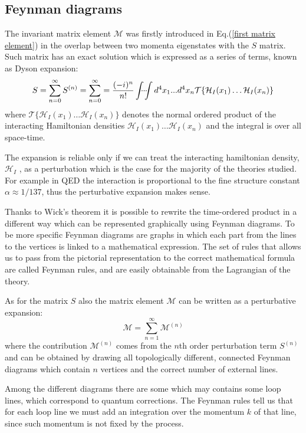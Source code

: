 \documentclass[../main/main.tex]{subfiles}
\begin{document}
\subsection{Feynman diagrams}
The invariant matrix element $\mathcal{M}$ was firstly introduced in Eq.(\ref{first matrix element}) in the overlap between two momenta
eigenstates with the $S$ matrix.
Such matrix has an exact solution which is expressed as a series of terms, known as Dyson expansion:
\begin{equation}
	\label{S}
	S = \sum_{n = 0}^{\infty} S^{(n)} = \sum_{n = 0}^{\infty} =  \frac{(-i)^n}{n!}\idotsint d^4 x_1 ... d^4 x_n \mathcal{T}\{ \mathcal{H}_I(x_1) \dots \mathcal{H}_I(x_n) \}
\end{equation}
where $\mathcal{T}\{ \mathcal{H}_I(x_1) \dots \mathcal{H}_I(x_n) \}$ denotes the normal ordered product of the interacting 
Hamiltonian densities $ \mathcal{H}_I(x_1) \dots \mathcal{H}_I(x_n)$ and the integral is over all space-time.

The expansion is reliable only if we can treat the interacting hamiltonian density, $\mathcal{H}_I$ , as a perturbation which is the case for 
the majority of the theories studied. For example in QED the interaction is proportional to the fine structure constant $\alpha \approx 1/137$, thus the perturbative expansion makes sense.

Thanks to Wick's theorem it is possible to rewrite the time-ordered product in a different way which can be represented graphically using Feynman diagrams. 
To be more specific Feynman diagrams are graphs in which each part from the lines to the vertices is linked to a mathematical expression.
The set of rules that allows us to pass from the pictorial representation to the correct mathematical formula are called Feynman rules, and
are easily obtainable from the Lagrangian of the theory.

As for the matrix $S$ also the matrix element $\mathcal{M}$ can be written as a perturbative expansion:
\begin{equation}
	\label{exp M}
	\mathcal{M}= \sum_{n = 1}^{\infty} \mathcal{M}^{(n)} 
\end{equation} 
where the contribution $\mathcal{M}^{(n)} $ comes from the $n$th order perturbation term $S^{(n)}$ and can be obtained by drawing 
all topologically different, connected Feynman diagrams which contain $n$ vertices and the correct number of external lines.

Among the different diagrams there are some which may contains some loop lines, which correspond to quantum corrections.
 The Feynman rules tell us that for each loop line we must add an integration over the momentum $k$ of that line, since such momentum is not fixed by the process.
\end{document}
